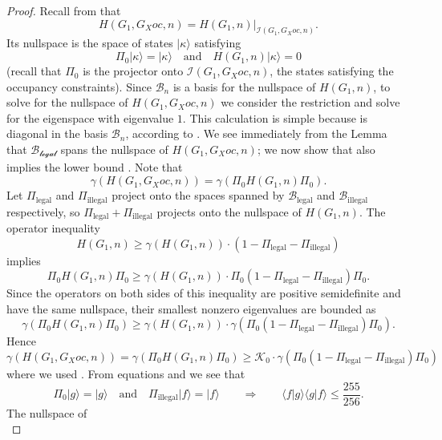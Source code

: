 \documentclass[../thesis-main/thesis-main]{subfiles}
\begin{document}
\begin{proof}
Recall from  that 
\[
H(G_{1},G_Xoc,n)=H(G_{1},n)|_{\mathcal{I}(G_{1},G_Xoc,n)}.
\]
Its nullspace is the space of states $|\kappa\rangle$ satisfying
\[
\Pi_{0}|\kappa\rangle=|\kappa\rangle\quad\text{and}\quad H(G_{1},n)|\kappa\rangle=0
\]
(recall that $\Pi_{0}$ is the projector onto $\mathcal{I}(G_{1},G_Xoc,n)$, the states satisfying the occupancy constraints). Since $\mathcal{B}_{n}$ is a basis for the nullspace of $H(G_{1},n)$, to solve for the nullspace of $H(G_{1},G_Xoc,n)$ we consider the restriction  and solve for the eigenspace with eigenvalue $1$. This calculation is simple because  is diagonal in the basis $\mathcal{B}_{n}$, according to . We see immediately from the Lemma that $\mathcal{\mathcal{B}_{\text{legal}}}$ spans the nullspace of $H(G_{1},G_Xoc,n)$; we now show that  also implies the lower bound . Note that
\[
\gamma(H(G_{1},G_Xoc,n))=\gamma(\Pi_{0}H(G_{1},n)\Pi_{0}).
\]
Let $\Pi_{\text{legal}}$ and $\Pi_{\text{illegal}}$ project onto the spaces spanned by $\mathcal{B}_{\text{legal}}$ and $\mathcal{B}_{\text{illegal}}$ respectively, so $\Pi_{\text{legal}}+\Pi_{\text{illegal}}$ projects onto the nullspace of $H(G_{1},n)$. The operator inequality
\[
H(G_{1},n)\geq\gamma(H(G_{1},n))\cdot\left(1-\Pi_{\text{legal}}-\Pi_{\text{illegal}}\right)
\]
implies 
\[
\Pi_{0}H(G_{1},n)\Pi_{0}\geq\gamma(H(G_{1},n))\cdot\Pi_{0}(1-\Pi_{\text{legal}}-\Pi_{\text{illegal}})\Pi_{0}.
\]
Since the operators on both sides of this inequality are positive semidefinite and have the same nullspace, their smallest nonzero eigenvalues are bounded as 
\[
\gamma(\Pi_{0}H(G_{1},n)\Pi_{0})\geq\gamma(H(G_{1},n))\cdot\gamma(\Pi_{0}(1-\Pi_{\text{legal}}-\Pi_{\text{illegal}})\Pi_{0}).
\]
Hence 
\begin{equation}
\gamma(H(G_{1},G_Xoc,n))=\gamma(\Pi_{0}H(G_{1},n)\Pi_{0}) \geq \mathcal{K}_0\cdot\gamma(\Pi_{0}(1-\Pi_{\text{legal}}-\Pi_{\text{illegal}})\Pi_{0})
\label{eq:gamma_bnd1}
\end{equation}
where we used . From equations  and  we see that 
\begin{equation}
\Pi_{0}|g\rangle=|g\rangle\quad\text{and}\quad\Pi_{\text{illegal}}|f\rangle=|f\rangle\qquad\Longrightarrow\qquad\langle f|g\rangle\langle g|f\rangle\leq\frac{255}{256}.\label{eq:fg_eqn}
\end{equation}
The nullspace of 
\begin{equation}

\end{equation}
\end{proof}
\end{document}
